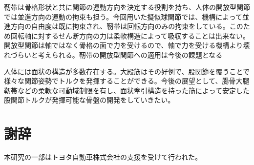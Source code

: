 \documentclass{jarticle}
\begin{document}
靭帯は骨格形状と共に関節の運動方向を決定する役割を持ち、人体の開放型関節では並進方向の運動の拘束も担う。今回用いた擬似球関節では、機構によって並進方向の自由度は既に拘束され、靭帯は回転方向のみの拘束をしている。このため回転軸に対するせん断方向の力は柔軟構造によって吸収することは出来ない。開放型関節は軸ではなく骨格の面で力を受けるので、軸で力を受ける機構より壊れづらいと考えられる。靭帯の開放型関節への適用は今後の課題となる

人体には面状の構造が多数存在する。大殿筋はその好例で、股関節を覆うことで様々な関節姿勢でトルクを発揮することができる。今後の展望として、腸骨大腿靭帯などの柔軟な可動域制限を有し、面状牽引構造を持った筋によって安定した股関節トルクが発揮可能な骨盤の開発をしていきたい。

\section{謝辞}
本研究の一部はトヨタ自動車株式会社の支援を受けて行われた。

\footnotesize



\normalsize
\end{document}
